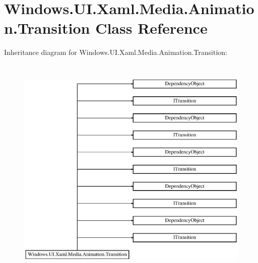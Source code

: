 \hypertarget{class_windows_1_1_u_i_1_1_xaml_1_1_media_1_1_animation_1_1_transition}{}\section{Windows.\+U\+I.\+Xaml.\+Media.\+Animation.\+Transition Class Reference}
\label{class_windows_1_1_u_i_1_1_xaml_1_1_media_1_1_animation_1_1_transition}
Inheritance diagram for Windows.\+U\+I.\+Xaml.\+Media.\+Animation.\+Transition\+:\begin{figure}[H]
\begin{center}
\leavevmode
\includegraphics[height=11.000000cm]{class_windows_1_1_u_i_1_1_xaml_1_1_media_1_1_animation_1_1_transition}
\end{center}
\end{figure}
